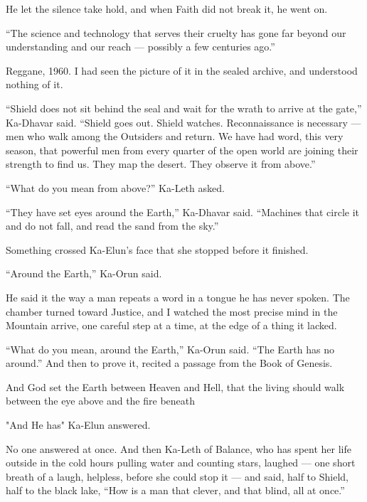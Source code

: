 He let the silence take hold, and when Faith did not break it, he went on.

``The science and technology that serves their cruelty has gone far beyond our understanding and our reach --- possibly a few centuries ago.''\par

Reggane, 1960. I had seen the picture of it in the sealed archive, and understood nothing of it.\par
 
``Shield does not sit behind the seal and wait for the wrath to arrive at the gate,'' Ka-Dhavar said.
``Shield goes out. Shield watches. Reconnaissance is necessary --- men who walk among the Outsiders and return. We have had word, this very season,
that powerful men from every quarter of the open world are joining their strength to find us.
They map the desert. They observe it from above.''\par
 
``What do you mean from above?'' Ka-Leth asked. \par
 
``They have set eyes around the Earth,'' Ka-Dhavar said. ``Machines that circle it and do not fall, and read the sand from the sky.'' 
 
Something crossed Ka-Elun's face that she stopped before it finished.\par

\ornament
 
``Around the Earth,'' Ka-Orun said.\par
 
He said it the way a man repeats a word in a tongue he has never spoken. The chamber turned toward Justice, and I watched the most precise mind in the Mountain arrive, one careful step at a time, at the edge of a thing it lacked.\par
 
``What do you mean, around the Earth,'' Ka-Orun said. ``The Earth has no around.'' And then to prove it, recited a passage from the Book of Genesis.

\begin{scripture}

And God set the Earth between Heaven and Hell, that the living should walk between the eye above and the fire beneath

\end{scripture}

"And He has" Ka-Elun answered.
 
No one answered at once. And then Ka-Leth of Balance, who has spent her life outside in the cold hours pulling water and counting stars, laughed --- one short breath of a laugh, helpless, before she could stop it --- and said, half to Shield, half to the black lake, ``How is a man that clever, and that blind, all at once.''\par
 
